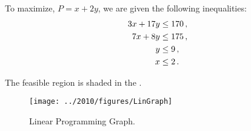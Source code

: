 %
%
\usetikzlibrary{patterns}

\begin{subquestions}
	

\subquestion

To maximize, $P = x+2y$, we are given the following inequalities:
\begin{align}
	3x + 17y & \leq 170 \,, \nonumber \\
	7x + 8y & \leq 175 \,, \nonumber \\
	y & \leq 9 \,, \nonumber \\
	x & \leq 2 \,.
\end{align}

\begin{subsubquestions}
	

\subsubquestion

The feasible region is shaded in the .
\begin{figure}
	\begin{center}
		\texttt{[image: ../2010/figures/LinGraph]}
		\caption{\label{2010:q1:fig:LinGraph} Linear Programming Graph.}
	\end{center}
\end{figure}



\end{subsubquestions}
\end{subquestions}
